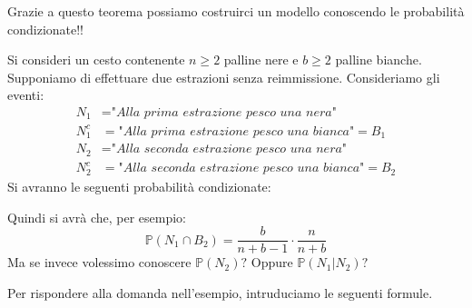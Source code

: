 Grazie a questo teorema possiamo costruirci un modello conoscendo le probabilità condizionate!! \large\smiley
\begin{esempio}
    Si consideri un cesto contenente $n\geq2$ palline nere e $b\geq2$ palline bianche. Supponiamo di effettuare due estrazioni senza reimmissione. Consideriamo gli eventi:
    \begin{align*}
         N_1 &= \textit{"Alla prima estrazione pesco una nera"}\\
         N_1^c &= \textit{"Alla prima estrazione pesco una bianca"} = B_1\\
         N_2 &=\textit{"Alla seconda estrazione pesco una nera"}\\
         N_2^c & = \textit{"Alla seconda estrazione pesco una bianca"} = B_2
    \end{align*}
    Si avranno le seguenti probabilità condizionate:

\begin{center}
\end{center}
Quindi si avrà che, per esempio: \[\mathbb{P}(N_1\cap B_2) = \frac{b}{n+b-1} \cdot \frac{n}{n+b}\]
Ma se invece volessimo conoscere $\mathbb{P}(N_2)?$ Oppure $\mathbb{P}(N_1|N_2)?$
\end{esempio}
Per rispondere alla domanda nell'esempio, intruduciamo le seguenti formule.
